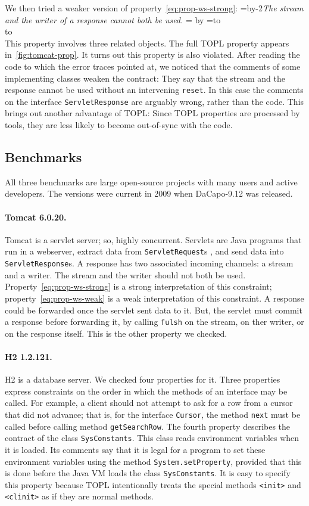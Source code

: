 \documentclass[9pt, preprint]{sigplanconf} %
\newcommand{\quoteindent}{1.5\parindent} %
\newcommand{\eqquote}[2]{{%
  \refstepcounter{equation}\label{#2}%
  \newdimen\qi\qi=\quoteindent
  \setbox0=\vbox{\advance\hsize by-2\qi\noindent\em#1}%
  \newdimen\x\x=\ht0 \advance\x by\dp0%
  \setbox1=\vbox to\x{\vss\hbox{(\arabic{equation})}\vss}%
  \leavevmode\\[1ex]%
  \hbox to\hsize{\hskip\qi\box0\hfil\box1}%
  \\[1ex]}}
\theoremstyle{definition}
\theoremstyle{remark}
\begin{document}
We then tried a weaker version of property~\eqref{eq:prop-ws-strong}:
\eqquote{The stream and the writer of a response cannot both be used.}
{eq:prop-ws-weak}
This property involves three related objects.
The full TOPL property appears in~\autoref{fig:tomcat-prop}.
It turns out this property is also violated.
After reading the code to which the error traces pointed at, we noticed that the comments of some implementing classes weaken the contract:
They say that the stream and the response cannot be used without an intervening {\tt reset}.
In this case the comments on the interface {\tt ServletResponse} are arguably wrong, rather than the code.
This brings out another advantage of TOPL:
Since TOPL properties are processed by tools, they are less likely to become out-of-sync with the code.

\subsection{Benchmarks} %

All three benchmarks are large open-source projects with many users and active developers.
The versions were current in 2009 when DaCapo-9.12 was released.

\paragraph{Tomcat 6.0.20.}
Tomcat is a servlet server; so, highly concurrent.
Servlets are Java programs that run in a webserver, extract data from {\tt ServletRequest}s , and send data into {\tt ServletResponse}s.
A response has two associated incoming channels: a stream and a writer.
The stream and the writer should not both be used.
Property~\eqref{eq:prop-ws-strong} is a strong interpretation of this constraint;
property~\eqref{eq:prop-ws-weak} is a weak interpretation of this constraint.
A response could be forwarded once the servlet sent data to it.
But, the servlet must commit a response before forwarding it, by calling {\tt fulsh} on the stream, on ther writer, or on the response itself.
This is the other property we checked.

\paragraph{H2 1.2.121.}
H2 is a database server.
We checked four properties for it.
Three properties express constraints on the order in which the methods of an interface may be called.
For example, a client should not attempt to ask for a row from a cursor that did not advance;
that is, for the interface {\tt Cursor}, the method {\tt next} must be called before calling method {\tt getSearchRow}.
The fourth property describes the contract of the class {\tt SysConstants}.
This class reads environment variables when it is loaded.
Its comments say that it is legal for a program to set these environment variables using the method {\tt System.setProperty}, provided that this is done before the Java VM loads the class {\tt SysConstants}.
It is easy to specify this property because TOPL intentionally treats the special methods {\tt <init>} and {\tt <clinit>} as if they are normal methods.
\end{document}
